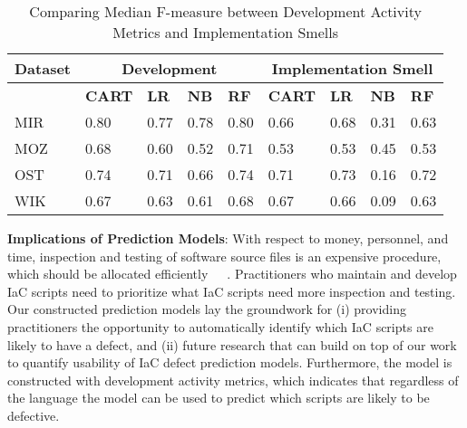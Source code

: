 \documentclass[smallextended]{svjour3}       %
\begin{document}
\begin{table*}[]
\centering
\caption{Comparing Median F-measure between Development Activity Metrics and Implementation Smells}
\label{res:rq1:table:f1:smell}
\footnotesize{  
\begin{tabular}{p{1.2cm} p{0.9cm} p{0.9cm} p{0.9cm} p{0.9cm} p{0.9cm} p{0.6cm} p{0.6cm} p{0.6cm}  }
\hline
\textbf{Dataset} & \multicolumn{4}{c}{\textbf{Development}} & \multicolumn{4}{c}{\textbf{Implementation Smell}}  \\
\hline
 &  \textbf{CART} & \textbf{LR} & \textbf{NB} & \textbf{RF} & \textbf{CART} & \textbf{LR} & \textbf{NB} & \textbf{RF} \\
\hline
MIR & \cellcolor{lightgray} 0.80 & 0.77 & 0.78 & \cellcolor{lightgray} 0.80 & 0.66 & 0.68 & 0.31 & 0.63   \\
MOZ & 0.68                       & 0.60 & 0.52 & \cellcolor{lightgray} 0.71 & 0.53 & 0.53 & 0.45 & 0.53   \\
OST & \cellcolor{lightgray} 0.74 & 0.71 & 0.66 & \cellcolor{lightgray} 0.74 & 0.71 & 0.73 & 0.16 & 0.72   \\
WIK & 0.67                       & 0.63 & 0.61 & \cellcolor{lightgray} 0.68 & 0.67 & 0.66 & 0.09 & 0.63  \\
\hline
\end{tabular}
}
\end{table*}  

\textbf{Implications of Prediction Models}: With respect to money, personnel, and time, inspection and testing of software source files is an expensive procedure, which should be allocated efficiently~\citep{ostrand:issta2004}~\citep{Adams:PrioritizeUnitTests:2011}~\citep{assmann:2012:test:priority}. Practitioners who maintain and develop IaC scripts need to prioritize what IaC scripts need more inspection and testing. Our constructed prediction models lay the groundwork for (i) providing practitioners the opportunity to automatically identify which IaC scripts are likely to have a defect, and (ii) future research that can build on top of our work to quantify usability of IaC defect prediction models. Furthermore, the model is constructed with development activity metrics, which indicates that regardless of the language the model can be used to predict which scripts are likely to be defective. 

\end{document}

